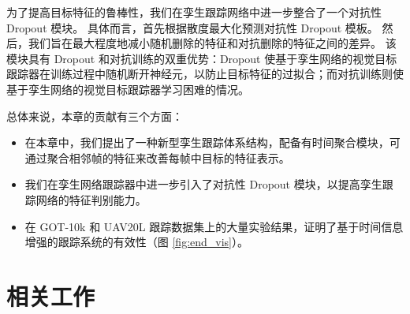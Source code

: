 为了提高目标特征的鲁棒性，我们在孪生跟踪网络中进一步整合了一个对抗性 Dropout \cite{park2018adversarial} 模块。
具体而言，首先根据散度最大化预测对抗性 Dropout 模板。
然后，我们旨在最大程度地减小随机删除的特征和对抗删除的特征之间的差异。
该模块具有 Dropout 和对抗训练的双重优势：Dropout 使基于孪生网络的视觉目标跟踪器在训练过程中随机断开神经元，以防止目标特征的过拟合；而对抗训练则使基于孪生网络的视觉目标跟踪器学习困难的情况。

总体来说，本章的贡献有三个方面：
\begin{itemize}
\item 在本章中，我们提出了一种新型孪生跟踪体系结构，配备有时间聚合模块，可通过聚合相邻帧的特征来改善每帧中目标的特征表示。
\item 我们在孪生网络跟踪器中进一步引入了对抗性 Dropout 模块，以提高孪生跟踪网络的特征判别能力。
\item 在 GOT-10k \cite{GOT-10k} 和 UAV20L \cite{mueller2016benchmark} 跟踪数据集上的大量实验结果，证明了基于时间信息增强的跟踪系统的有效性（图 \ref{fig:end_vis}）。
\end{itemize}

\section{相关工作}
